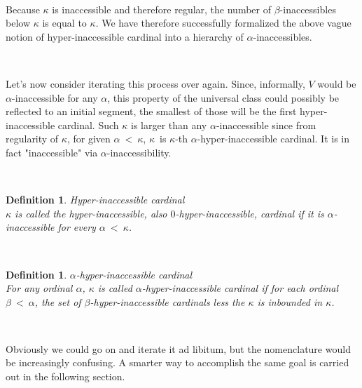 \documentclass[12pt,a4paper]{article}
\newtheorem{definition}[theorem]{Definition}
\begin{document}
\

Because $\kappa$ is inaccessible and therefore regular, the number of $\beta$-inaccessibles below $\kappa$ is equal to $\kappa$. We have therefore successfully formalized the above vague notion of hyper-inaccessible cardinal into a hierarchy of $\alpha$-inaccessibles.

\

Let's now consider iterating this process over again. Since, informally, $V$ would be $\alpha$-inaccessible for any $\alpha$, this property of the universal class could possibly be reflected to an initial segment, the smallest of those will be the first hyper-inaccessible cardinal. Such $\kappa$ is larger than any $\alpha$-inaccessible since from regularity of $\kappa$, for given $\alpha\ <\ \kappa$, $\kappa$ is $\kappa$-th $\alpha$-hyper-inaccessible cardinal. It is in fact "inaccessible" via $\alpha$-inaccessibility.

\

\begin{definition}{Hyper-inaccessible cardinal}\\
$\kappa$ is called the hyper-inaccessible, also $0$-hyper-inaccessible, cardinal if it is $\alpha$-inaccessible for every $\alpha\ <\ \kappa$.
\end{definition}

\

\begin{definition}{$\alpha$-hyper-inaccessible cardinal}\\
For any ordinal $\alpha$, $\kappa$ is called $\alpha$-hyper-inaccessible cardinal if for each ordinal $\beta\ <\ \alpha$, the set of $\beta$-hyper-inaccessible cardinals less the $\kappa$ is inbounded in $\kappa$.
\end{definition}

\

Obviously we could go on and iterate it ad libitum, but the nomenclature would be increasingly confusing. A smarter way to accomplish the same goal is carried out in the following section.


\end{document}
